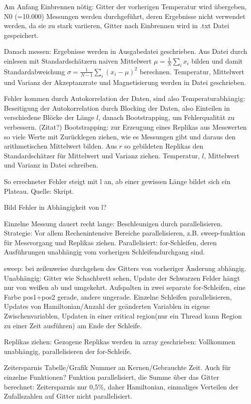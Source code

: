 \documentclass{scrreprt}
\begin{document}
	Am Anfang Einbrennen nötig: Gitter der vorherigen Temperatur wird übergeben, N0 (=10.000) Messungen werden durchgeführt, deren Ergebnisse nicht verwendet werden, da sie zu stark variieren, Gitter nach Einbrennen wird in .txt Datei gespeichert.
	
	Danach messen: Ergebnisse werden in Ausgabedatei geschrieben.
	Aus Datei durch einlesen mit Standardschätzern naiven Mittelwert $\mu=\frac{1}{N}\sum_{i} x_i$ bilden und damit Standardabweichung $\sigma=\frac{1}{N-1}\sum_{i}(x_i-\mu)^2$ berechnen. Temperatur, Mittelwert und Varianz der Akzeptanzrate und Magnetisierung werden in Datei geschrieben.
	
	Fehler kommen durch Autokorrelation der Daten, sind also Temperaturabhängig: Beseitigung der Autokorrelation durch Blocking der Daten, also Einteilen in verschiedene Blöcke der Länge $l$, danach Bootstrapping, um Fehlerqualität zu verbessern. (Zitat?)
	Bootstrapping: zur Erzeugung eines Replikas aus Messwerten so viele Werte mit Zurücklegen ziehen, wie es Messungen gibt und daraus den arithmetischen Mittelwert bilden. Aus $r$ so gebildeten Replikas den Standardschätzer für Mittelwert und Varianz ziehen. Temperatur, $l$, Mittelwert und Varianz in Datei schreiben.
	
	So errechneter Fehler steigt mit l an, ab einer gewissen Länge bildet sich ein Plateau. Quelle: Skript.
	
	Bild Fehler in Abhängigkeit von l?
	
	Einzelne Messung dauert recht lange: Beschleunigen durch parallelisieren. 
	Strategie: Vor allem Rechenintensive Bereiche parallelisieren, z.B. sweep-funktion für Messvorgang und Replikas ziehen.
	Parallelisiert: for-Schleifen, deren Ausführungen unabhängig vom vorherigen Schleifendurchgang sind.
	
	sweep: bei zeilenweise durchgehen des Gitters von vorheriger Änderung abhängig.
	Unabhängig: Gitter wie Schachbrett sehen, Update der Schwarzen Felder hängt nur von weißen ab und umgekehrt. Aufspalten in zwei separate for-Schleifen, eine Farbe pos1+pos2 gerade, andere ungerade. Einzelne Schleifen parallelisieren, Updates von Hamiltonian/Anzahl der geänderten Variablen in eigene Zwischenvariablen, Updaten in einer critical region(nur ein Thread kann Region zu einer Zeit ausführen) am Ende der Schleife.
	
	Replikas ziehen: Gezogene Replikas werden in array geschrieben: Vollkommen unabhängig, parallelisieren der for-Schleife.
	
	Zeitersparnis Tabelle/Grafik Nummer an Kernen/Gebrauchte Zeit. Auch für einzelne Funktionen?
	Funktion parallelisiert, die Summe über das Gitter berechnet: Zeitersparnis nur 0,5\%, daher Hamiltonian, einmaliges Verteilen der Zufallszahlen auf Gitter nicht parallelisiert.
	
\end{document}

